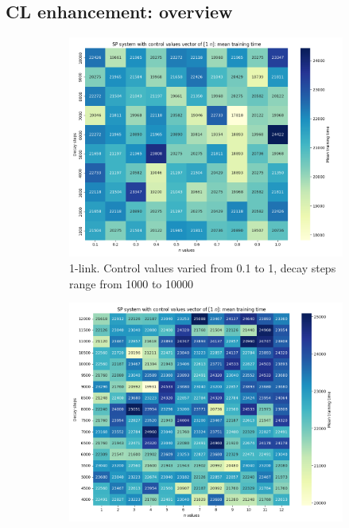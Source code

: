 \subsection{CL enhancement: overview} 


\begin{figure}[h!]
	\centering
	\begin{subfigure}[t]{0.48\textwidth}
		\centering
		\includegraphics[width=\textwidth]{Figures/SP_cv_01_to_1.png}
		\caption{1-link. Control values varied from 0.1 to 1, decay steps range from 1000 to 10000}
	\end{subfigure}
	\begin{subfigure}[t]{0.48\textwidth}
		\centering
		\includegraphics[width=\textwidth]{Figures/SP_cv_1_to_12.png}

\end{subfigure}
\end{figure}
